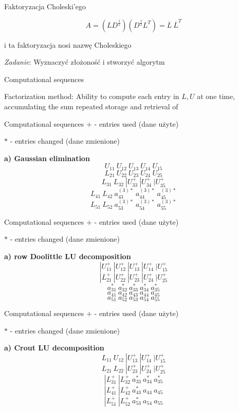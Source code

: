 \begin{frame}{Faktoryzacja Choleski'ego}
\begin{exampleblock}{}
$$
A=(LD^{\frac{1}{2}})(D^{\frac{1}{2}}L^{T})=\overline{L}\ \overline{L}^{T}
$$
\end{exampleblock}
i ta faktoryzacja nosi nazwę Choleskiego
\begin{flushright}
{\it Zadanie}: Wyznaczyć złożoność i stworzyć algorytm
\end{flushright}
\end{frame}
\begin{frame}{Computational sequences}
\begin{exampleblock}{Factorization method:}
Ability to compute each entry in $L,U$ at one time, accumulating the sum repeated storage and retrieval of 
\end{exampleblock}
 

\end{frame}
\begin{frame}{Computational sequences}
$+$ - entries used (dane użyte)

$*$ - entries changed (dane zmienione)

\textbf{ a) Gaussian elimination}
$$
U_{11}\ U_{12}\ U_{13}\ U_{14}\ U_{15}
$$
$$
L_{21}\ U_{22}\ U_{23}\ U_{24}\ U_{25}
$$
$$
L_{31}\ L_{32}\ |U_{33}^{+}\ |U_{34}^{+}\ |U_{35}^{+}
$$
$$
L_{41}\ L_{42}\ a_{43}^{(3)*}\ a_{44}^{(3)*}\ a_{45}^{(3)*}
$$
$$
L_{51}\ L_{52}\ a_{53}^{(3)*}\ a_{54}^{(3)*}\ a_{55}^{(3)*}
$$

\end{frame}
\begin{frame}{Computational sequences}
$+$ - entries used (dane użyte)

$*$ - entries changed (dane zmienione)


\textbf{a) row Doolittle LU decomposition}
$$
|U_{11}^{+}\ |U_{12}^{+}\ |U_{13}^{+}\ |U_{14}^{+}\ |U_{15}^{+}
$$
$$
|L_{21}^{+}\ |U_{22}^{+}\ |U_{23}^{+}\ |U_{24}^{+}\ |U_{25}^{+} 
$$
$$
a_{31}^{*}\ a_{32}^{*}\ a_{33}^{*}\ a_{34}^{*}\ a_{35}^{*}
$$
$$
a_{41}\ a_{42}\ a_{43}\ a_{44}\ a_{45} 
$$
$$
a_{51}\ a_{52}\ a_{53}\  a_{54}\ a_{55}
$$

\end{frame}
\begin{frame}{Computational sequences}
$+$ - entries used (dane użyte)

$*$ - entries changed (dane zmienione)


\textbf{a) Crout LU decomposition}
$$
L_{11}\ U_{12}\ |U_{13}^{+}\ |U_{14}^{+}\ |U_{15}^{+} 
$$
$$
L_{21}\ L_{22}\ |U_{23}^{+}\ |U_{24}^{+}\ |U_{25}^{+} 
$$
$$
|L_{31}^{+}\ |L_{32}^{+}\ a_{33}^{*}\ a_{34}^{*}\ a_{35}^{*}
$$
$$
|L_{41}^{+}\ |L_{42}^{+}\ a_{43}^{*}\ a_{44}\ a_{45}
$$
$$
|L_{51}^{+}\ |L_{52}^{+}\ a_{53}^{*}\ a_{54}\ a_{55}
$$

\end{frame}
